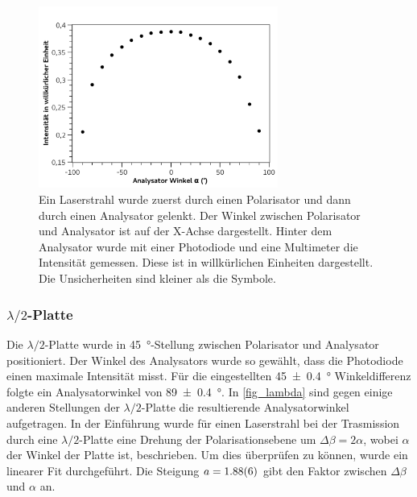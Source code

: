 \documentclass[
	a4paper,
	12pt,
	pagesize,
	ngerman
]{scrartcl}
\begin{document}
	\begin{figure}[H]
		\includegraphics[width=0.7\textwidth]{fig_Malus1}
		\centering
		\caption{Ein Laserstrahl wurde zuerst durch einen Polarisator und dann durch einen Analysator gelenkt. 
		Der Winkel zwischen Polarisator und Analysator ist auf der X-Achse dargestellt. 
		Hinter dem Analysator wurde mit einer Photodiode und eine Multimeter die Intensität gemessen. 
		Diese ist in willkürlichen Einheiten dargestellt. 
		Die Unsicherheiten sind kleiner als die Symbole.} %
		\label{fig_Malus1}
		\centering
	\end{figure}
	\subsubsection{$\lambda/2$-Platte}
	Die $\lambda/2$-Platte wurde in \SI{45}{\degree}-Stellung zwischen Polarisator und Analysator positioniert.  
	Der Winkel des Analysators wurde so gewählt, dass die Photodiode einen maximale Intensität misst.
	Für die eingestellten \SI{45+-0,4}{\degree} Winkeldifferenz folgte ein Analysatorwinkel von \SI{89+-0,4}{\degree}.
	In \cref{fig_lambda} sind gegen einige anderen Stellungen der $\lambda/2$-Platte die resultierende Analysatorwinkel aufgetragen. 
	In der Einführung wurde für einen Laserstrahl bei der Trasmission durch eine $\lambda/2$-Platte eine Drehung der Polarisationsebene um $\Delta\beta=2\alpha$, wobei $\alpha$ der Winkel der Platte ist, beschrieben.
	Um dies überprüfen zu können, wurde ein linearer Fit durchgeführt.
	Die Steigung $a=\SI{1,88+-0,06}{}$ gibt den Faktor zwischen $\Delta\beta$ und $\alpha$ an.
\end{document}
